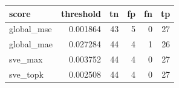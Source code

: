 \begin{tabular}{lrrrrr}
\toprule
score & threshold & tn & fp & fn & tp \\
\midrule
global_mse & 0.001864 & 43 & 5 & 0 & 27 \\
global_mae & 0.027284 & 44 & 4 & 1 & 26 \\
sve_max & 0.003752 & 44 & 4 & 0 & 27 \\
sve_topk & 0.002508 & 44 & 4 & 0 & 27 \\
\bottomrule
\end{tabular}
